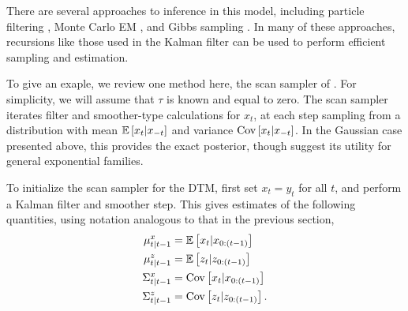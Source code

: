 \documentclass{article}
\begin{document}
There are several approaches to inference in this model, including particle
filtering \citep{doucet2000rao}, Monte Carlo EM \citep{manrique1998simulation},
and Gibbs sampling \citep{de1997scan, wei1999bayesian}. In many of these
approaches, recursions like those used in the Kalman filter can be used to
perform efficient sampling and estimation.

To give an exaple, we review one method here, the scan sampler of
\citep{de1997scan}. For simplicity, we will assume that $\tau$ is known and
equal to zero. The scan sampler iterates filter and smoother-type calculations
for $x_t$, at each step sampling from a distribution with mean $\mathbb{E}\left[{x_t \vert
  x_{-t}}\right]$ and variance $\mathrm{Cov}\left[{x_t \vert x_{-t}}\right]$. In the Gaussian case
presented above, this provides the exact posterior, though \cite{de1997scan}
suggest its utility for general exponential families.

To initialize the scan sampler for the DTM, first set $x_t = y_t$ for all $t$,
and perform a Kalman filter and smoother step. This gives estimates of the
following quantities, using notation analogous to that in the previous section,
\begin{align*}
  \mu_{t \vert t - 1}^{x} &= \mathbb{E}\left[{x_t \vert x_{0:\left(t - 1\right)}}\right] \\
  \mu_{t \vert t - 1}^{z} &= \mathbb{E}\left[{z_t \vert z_{0:\left(t - 1\right)}}\right] \\
  \Sigma_{t \vert t - 1}^{x} &= \mathrm{Cov}\left[{x_t \vert x_{0:\left(t - 1\right)}}\right] \\
  \Sigma_{t \vert t - 1}^{z} &= \mathrm{Cov}\left[{z_t \vert z_{0 : \left(t - 1\right)}}\right].
\end{align*}
\end{document}
